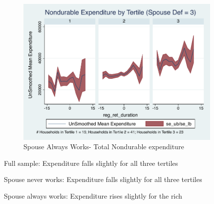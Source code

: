 \documentclass[a4paper]{article}
\begin{document}
\begin{figure}[H]
	\caption{Spouse Always Works- Total Nondurable expenditure}
	\centering
	\includegraphics[width=0.9\textwidth]{../ConsumptionPostRetirement_by_SpouseDef/UnSmoothed/spouse_def_3.pdf}
\end{figure}

Full sample: Expenditure falls slightly for all three tertiles

Spouse never works: Expenditure falls slightly for all three tertiles

Spouse always works: Expenditure rises slightly for the rich

\clearpage





\end{document}
